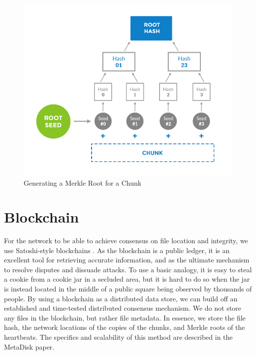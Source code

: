 \documentclass[a4paper,10pt]{article}
\begin{document}
\begin{figure}[h!]
\centering
\includegraphics[width=\linewidth]{2}
\caption{Generating a Merkle Root for a Chunk}
\end{figure}


\section{Blockchain}
For the network to be able to achieve consensus on file location and integrity, we use Satoshi-style blockchains \cite{3}. As the blockchain is a public ledger, it is an excellent tool for retrieving accurate information, and as the ultimate mechanism to resolve disputes and dissuade attacks. To use a basic analogy, it is easy to steal a cookie from a cookie jar in a secluded area, but it is hard to do so when the jar is instead located in the middle of a public square being observed by thousands of people. By using a blockchain as a distributed data store, we can build off an established and time-tested distributed consensus mechanism. We do not store any files in the blockchain, but rather file metadata. In essence, we store the file hash, the network locations of the copies of the chunks, and Merkle roots of the heartbeats. The specifics and scalability of this method are described in the MetaDisk \cite{1} paper.  \\
\end{document}

